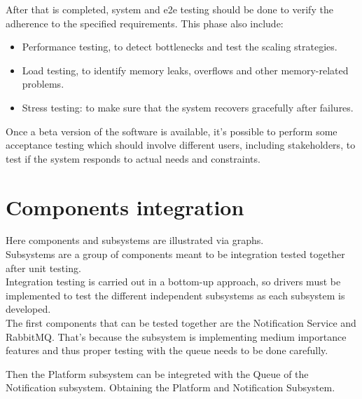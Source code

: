 After that is completed, system and e2e testing should be done to verify the adherence to the specified requirements.
This phase also include:
\begin{itemize}
    \item Performance testing, to detect bottlenecks and test the scaling strategies. 
    \item Load testing, to identify memory leaks, overflows and other memory-related problems.
    \item Stress testing: to make sure that the system recovers gracefully after failures.
\end{itemize}
Once a beta version of the software is available, it's possible to perform some acceptance testing which should
involve different users, including stakeholders, to test if the system responds to actual needs and constraints.
\pagebreak
\section{Components integration}
Here components and subsystems are illustrated via graphs. \\
Subsystems are a group of components meant to be integration tested together after unit testing.\\
Integration testing is carried out in a bottom-up approach, so drivers must be implemented to test the different independent subsystems as each subsystem is developed.\\
The first components that can be tested together are the Notification Service and RabbitMQ.
That's because the subsystem is implementing medium importance features and thus proper testing with the queue needs to be done carefully.
\begin{adjustbox}{
        max size={\textwidth}{},
        center,
        caption={Notitification subsystem},
        label={fig:Notitification subsystem},
        figure=H}
\end{adjustbox}

Then the Platform subsystem can be integreted with the Queue of the Notification subsystem.
Obtaining the Platform and Notification Subsystem.
\begin{adjustbox}{
        max size={\textwidth}{},
        center,
        caption={Platform and Notification subsystem},
        label={fig:Platform and Notification subsystem},
        figure=H}
\end{adjustbox}

